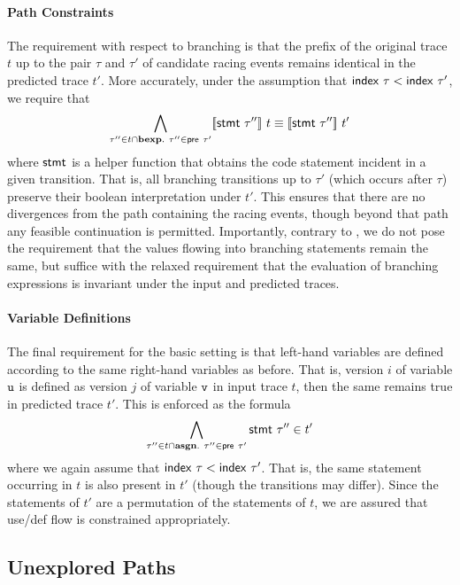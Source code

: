 \paragraph{Path Constraints}

The requirement with respect to branching is that the prefix of the original trace $t$ up to the pair $\tau$ and $\tau'$ of candidate racing events remains identical in the predicted trace $t'$. More accurately, under the assumption that ${\sf index}\ \tau < {\sf index}\ \tau'$, 
we require that 
$$
	\bigwedge_{\tau'' \in t \cap {\bf bexp}.\
		\tau'' \in {\sf pre}\ \tau'} \lbrack\!\lbrack {\sf stmt}\ \tau'' \rbrack\!\rbrack\ t \equiv \lbrack\!\lbrack {\sf stmt}\ \tau'' \rbrack\!\rbrack\ t'
$$ 
where ${\sf stmt}$ is a helper function that obtains the code statement incident in a given transition. That is, all branching transitions up to $\tau'$ (which occurs after $\tau$) preserve their boolean interpretation under $t'$. This ensures that there are no divergences from the path containing the racing events, though beyond that path any feasible continuation is permitted. Importantly, contrary to \cite{JEFF-PLDI14}, we do not pose the requirement that the values flowing into branching statements remain the same, but suffice with the relaxed requirement that the evaluation of branching expressions is invariant under the input and predicted traces.

\paragraph{Variable Definitions}

The final requirement for the basic setting is that left-hand variables are defined according to the same right-hand variables as before. That is, version $i$ of variable ${\tt u}$ is defined as version $j$ of variable ${\tt v}$ in input trace $t$, then the same remains true in predicted  trace $t'$. This is enforced as the formula
$$
	\bigwedge_{\tau'' \in t \cap {\bf asgn}.\
		\tau'' \in {\sf pre}\ \tau'} {\sf stmt}\ \tau'' \in t' 
$$
where we again assume that ${\sf index}\ \tau < {\sf index}\ \tau'$. That is, the same statement occurring in $t$ is also present in $t'$ (though the transitions may differ). Since the statements of $t'$ are a permutation of the statements of $t$, we are assured that use/def flow is constrained appropriately.

\subsection{Unexplored Paths}


